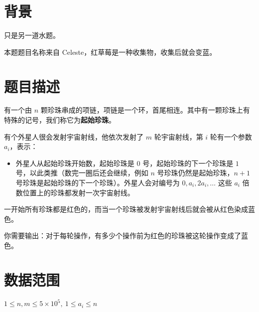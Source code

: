 \documentclass[a4paper,10pt]{article}
\begin{document}
\newpage

\section*{背景}

只是另一道水题。

本题题目名称来自 Celeste，红草莓是一种收集物，收集后就会变蓝。

\section*{题目描述}

有一个由 $n$ 颗珍珠串成的项链，项链是一个环，首尾相连。其中有一颗珍珠上有特殊的记号，我们称它为\textbf{起始珍珠}。

有个外星人很会发射宇宙射线，他依次发射了 $m$ 轮宇宙射线，第 $i$ 轮有一个参数 $a_i$，表示：

\begin{itemize}
\item 外星人从起始珍珠开始数，起始珍珠是 $0$ 号，起始珍珠的下一个珍珠是 $1$ 号，以此类推（数完一圈后还会继续，例如 $n$ 号珍珠仍然是起始珍珠，$n+1$ 号珍珠是起始珍珠的下一个珍珠）。外星人会对编号为 $0,a_i,2a_i,\ldots$ 这些 $a_i$ 倍数位置上的珍珠都发射一次宇宙射线。
\end{itemize}

一开始所有珍珠都是红色的，而当一个珍珠被发射宇宙射线后就会被从红色染成蓝色。

你需要输出：对于每轮操作，有多少个操作前为红色的珍珠被这轮操作变成了蓝色。

\section*{数据范围}

$1\leq n,m\leq 5\times 10^5,\ 1\leq a_i\leq n$

\newpage
\end{document}
